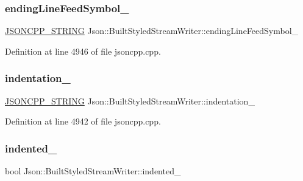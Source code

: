 \subsubsection{\texorpdfstring{ending\+Line\+Feed\+Symbol\+\_\+}{endingLineFeedSymbol\_}}
{\footnotesize\ttfamily \hyperlink{config_8h_a1e723f95759de062585bc4a8fd3fa4be}{J\+S\+O\+N\+C\+P\+P\+\_\+\+S\+T\+R\+I\+NG} Json\+::\+Built\+Styled\+Stream\+Writer\+::ending\+Line\+Feed\+Symbol\+\_\+\hspace{0.3cm}{\ttfamily [private]}}



Definition at line 4946 of file jsoncpp.\+cpp.

\hypertarget{struct_json_1_1_built_styled_stream_writer_aaa4cbad91428ceca37cbabfc2a17a92d}{}\label{struct_json_1_1_built_styled_stream_writer_aaa4cbad91428ceca37cbabfc2a17a92d} 
\subsubsection{\texorpdfstring{indentation\+\_\+}{indentation\_}}
{\footnotesize\ttfamily \hyperlink{config_8h_a1e723f95759de062585bc4a8fd3fa4be}{J\+S\+O\+N\+C\+P\+P\+\_\+\+S\+T\+R\+I\+NG} Json\+::\+Built\+Styled\+Stream\+Writer\+::indentation\+\_\+\hspace{0.3cm}{\ttfamily [private]}}



Definition at line 4942 of file jsoncpp.\+cpp.

\hypertarget{struct_json_1_1_built_styled_stream_writer_a6aa0ad023e623f600103631a6bca6d10}{}\label{struct_json_1_1_built_styled_stream_writer_a6aa0ad023e623f600103631a6bca6d10} 
\subsubsection{\texorpdfstring{indented\+\_\+}{indented\_}}
{\footnotesize\ttfamily bool Json\+::\+Built\+Styled\+Stream\+Writer\+::indented\+\_\+\hspace{0.3cm}{\ttfamily [private]}}



